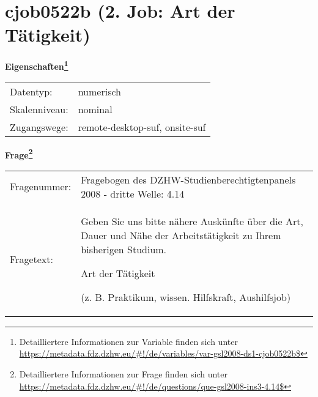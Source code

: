 
    \setcounter{footnote}{0}

    \vspace*{-1.8cm}
	\section{cjob0522b (2. Job: Art der Tätigkeit)}
	\label{section:cjob0522b}



    \vspace*{0.5cm}
    \noindent\textbf{Eigenschaften\footnote{Detailliertere Informationen zur Variable finden sich unter
		\url{https://metadata.fdz.dzhw.eu/\#!/de/variables/var-gsl2008-ds1-cjob0522b$}}}\\
	\begin{tabularx}{\hsize}{@{}lX}
	Datentyp: & numerisch \\
	Skalenniveau: & nominal \\
	Zugangswege: &
	  remote-desktop-suf, 
	  onsite-suf
 \\
    \end{tabularx}



				\vspace*{0.5cm}
                \noindent\textbf{Frage\footnote{Detailliertere Informationen zur Frage finden sich unter
		              \url{https://metadata.fdz.dzhw.eu/\#!/de/questions/que-gsl2008-ins3-4.14$}}}\\
				\begin{tabularx}{\hsize}{@{}lX}
					Fragenummer: &
					  Fragebogen des DZHW-Studienberechtigtenpanels 2008 - dritte Welle:
					  4.14
 \\
					Fragetext: & Geben Sie uns bitte nähere Auskünfte über die Art, Dauer und Nähe der Arbeitstätigkeit zu Ihrem bisherigen Studium.\par  Art der Tätigkeit\par  (z. B. Praktikum, wissen. Hilfskraft, Aushilfsjob) \\
				\end{tabularx}





